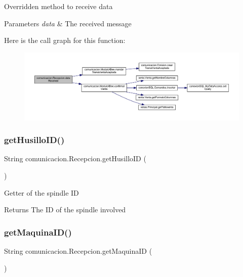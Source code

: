 Overridden method to receive data 
\begin{DoxyParams}{Parameters}
{\em data} & The received message \\
\hline
\end{DoxyParams}
Here is the call graph for this function\+:
\nopagebreak
\begin{figure}[H]
\begin{center}
\leavevmode
\includegraphics[width=350pt]{classcomunicacion_1_1_recepcion_a83305dfbd31ca36b129c0cfb4e86a486_cgraph}
\end{center}
\end{figure}
\mbox{\label{classcomunicacion_1_1_recepcion_a28eb0ee1c4a921ad9df8f893ba6809ed}} 
\subsubsection{\texorpdfstring{get\+Husillo\+I\+D()}{getHusilloID()}}
{\footnotesize\ttfamily String comunicacion.\+Recepcion.\+get\+Husillo\+ID (\begin{DoxyParamCaption}{ }\end{DoxyParamCaption})}

Getter of the spindle ID \begin{DoxyReturn}{Returns}
The ID of the spindle involved 
\end{DoxyReturn}
\mbox{\label{classcomunicacion_1_1_recepcion_ab22533d01a1695958053c9898318f993}} 
\subsubsection{\texorpdfstring{get\+Maquina\+I\+D()}{getMaquinaID()}}
{\footnotesize\ttfamily String comunicacion.\+Recepcion.\+get\+Maquina\+ID (\begin{DoxyParamCaption}{ }\end{DoxyParamCaption})}

